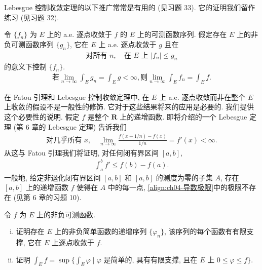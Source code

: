 \documentclass[../../main.tex]{subfiles}
\begin{document}
Lebesgue 控制收敛定理的以下推广常常是有用的 (见习题 33). 它的证明我们留作练习 (见习题 32).

\begin{theorem}\label{theorem:ch04-一般LDCT}
令 $\{f_{n}\}$ 为 $E$ 上的 a.e. 逐点收敛于 $f$ 的 $E$ 上的可测函数序列. 假定存在 $E$ 上的非负可测函数序列 $\{g_{n}\}$, 它在 $E$ 上 a.e. 逐点收敛于 $g$ 且在
\begin{align*}
\text{对所有 }n,\quad\text{在 }E\text{ 上 }|f_{n}|\leqslant g_{n}
\end{align*}
的意义下控制 $\{f_{n}\}$.
\begin{align*}
\text{若}\lim_{n\to\infty}\int_{E}g_{n}=\int_{E}g<\infty,\text{则}\lim_{n\to\infty}\int_{E}f_{n}=\int_{E}f.
\end{align*}
\end{theorem}

\begin{remark}
在 Fatou 引理和 Lebesgue 控制收敛定理中, 在 $E$ 上 a.e. 逐点收敛而非在整个 $E$ 上收敛的假设不是一般性的修饰. 它对于这些结果将来的应用是必要的. 我们提供这个必要性的说明. 假定 $f$ 是整个 $\mathbf{R}$ 上的递增函数. 即将介绍的一个 Lebesgue 定理 (第 6 章的 Lebesgue 定理) 告诉我们
\begin{align}
\text{对几乎所有 }x,\quad\lim_{n\to\infty}\frac{f(x+1/n)-f(x)}{1/n}=f'(x)<\infty.\label{align:ch04-导数极限}
\end{align}
从这与 Fatou 引理我们将证明, 对任何闭有界区间 $[a,b]$,
\begin{align*}
\int_{a}^{b}f'\leqslant f(b)-f(a).
\end{align*}
一般地, 给定非退化闭有界区间 $[a,b]$ 和 $[a,b]$ 的测度为零的子集 $A$, 存在 $[a,b]$ 上的递增函数 $f$ 使得在 $A$ 中的每一点, \eqref{align:ch04-导数极限}中的极限不存在 (见第 6 章的习题 10).
\end{remark}

\begin{exercise}\label{exercise:ch04-24}
令 $f$ 为 $E$ 上的非负可测函数.
\begin{enumerate}[(i)]
\item 证明存在 $E$ 上的非负简单函数的递增序列 $\{\varphi_{n}\}$, 该序列的每个函数有有限支撑, 它在 $E$ 上逐点收敛于 $f$.
\item 证明 $\int_{E}f=\sup\{\int_{E}\varphi\mid\varphi\text{ 是简单的, 具有有限支撑, 且在 }E\text{ 上 }0\leqslant\varphi\leqslant f\}$.
\end{enumerate}
\end{exercise}
\end{document}
